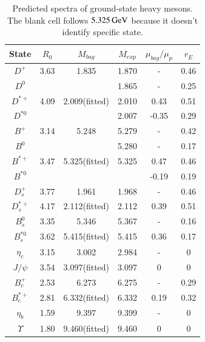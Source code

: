 \documentclass[prd,twocolumn,floatfix,nofootinbib]{revtex4}
\begin{document}
\renewcommand{\tabcolsep}{0.3cm}
\renewcommand{\arraystretch}{1.3}
\begin{table}[!htbp]
    \caption{Predicted spectra of ground-state heavy mesons. The blank cell follows $5.325\,{\rm GeV}$ because it doesn’t identify specific state.}
    \label{tab:heavymeson}
    \begin{tabular}{cccccc}
        \hline\hline
        {\rm State}             &$R_{0}$    &$M_{bag}$      &$M_{exp}$  &$\mu_{bag}/\mu_{p}$    &$r_{E}$ \\ \hline
        $D^{+}$ 	            &3.63	    &1.835	        &1.870	    &-                      &0.46 \\ 
        $D^{0}$ 			    &           &               &1.865	    &-                      &0.25 \\ 
        $D^{\ast +}$ 	        &4.09	    &2.009(fitted)  &2.010	    &0.43                   &0.51 \\ 
        $D^{\ast 0}$ 		    &           &               &2.007	    &-0.35                  &0.29 \\ 
        $B^{+}$ 	            &3.14	    &5.248	        &5.279	    &-                      &0.42 \\ 
        $B^{0}$ 			    &           &               &5.280	    &-                      &0.17 \\ 
        $B^{\ast +}$ 	        &3.47	    &5.325(fitted)  &5.325      &0.47                   &0.46 \\ 
        $B^{\ast 0}$ 		    &           &               &           &-0.19                  &0.19 \\ 
        $D_{s}^{+}$ 	        &3.77	    &1.961	        &1.968	    &-                      &0.46 \\ 
        $D_{s}^{\ast +}$ 	    &4.17	    &2.112(fitted)  &2.112	    &0.39                   &0.51 \\ 
        $B_{s}^{0}$ 	        &3.35	    &5.346	        &5.367	    &-                      &0.16 \\ 
        $B_{s}^{\ast 0}$ 	    &3.62	    &5.415(fitted)  &5.415	    &0.36                   &0.17 \\ 
        $\eta_{c}$ 	            &3.15	    &3.002	        &2.984	    &-                      &0 \\ 
        $J/\psi$ 	            &3.54	    &3.097(fitted)  &3.097	    &0                      &0 \\ 
        $B_{c}^{+}$ 	        &2.53	    &6.273	        &6.275	    &-                      &0.29 \\ 
        $B_{c}^{\ast +}$ 	    &2.81	    &6.332(fitted)  &6.332	    &0.19                   &0.32 \\ 
        $\eta_{b}$ 	            &1.59	    &9.397	        &9.399	    &-                      &0 \\ 
        $\Upsilon$ 	            &1.80	    &9.460(fitted)  &9.460	    &0                      &0 \\ 
        \hline\hline
    \end{tabular}
\end{table}
\end{document}
